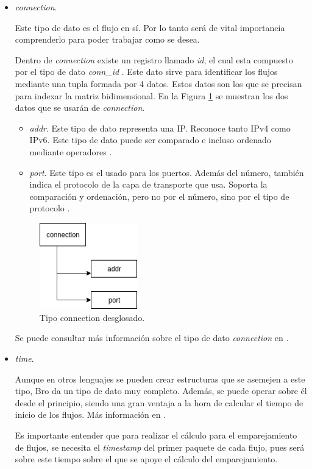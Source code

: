 \begin{itemize}

\item \textit{connection}. 

\intro Este tipo de dato es el flujo en sí. Por lo tanto será de vital importancia comprenderlo para poder trabajar como se desea.

\intro Dentro de \textit{connection} existe un registro llamado \textit{id}, el cual esta compuesto por el tipo de dato \textit{conn\_id} \cite{broconnid}. Este dato sirve para identificar los flujos mediante una tupla formada por 4 datos. Estos datos son los que se 
precisan para indexar la matriz bidimensional. En la Figura \ref{fig.connection} se muestran los dos datos que se usarán de \textit{connection}.

  \begin{itemize}

  \item \textit{addr}. Este tipo de dato representa una IP. Reconoce tanto IPv4 como IPv6. Este tipo de dato puede 
  ser comparado e incluso ordenado mediante operadores \cite{broaddr}.

  \item \textit{port}. Este tipo es el usado para los puertos. Además del número, también indica el 
  protocolo de la capa de transporte que usa. Soporta la comparación y ordenación, pero no por el número, sino por 
  el tipo de protocolo \cite{broport}.
  \end{itemize}

\begin{figure}[H]
  \includegraphics[width=0.4\textwidth]{imagenes/connection.png}
  \centering
  \caption{Tipo connection desglosado.}\label{fig.connection}
\end{figure}

  
\intro Se puede consultar más información sobre el tipo de dato \textit{connection} en \cite{connectiontype}.

\item \textit{time}. 

\intro Aunque en otros lenguajes se pueden crear estructuras que se asemejen a este tipo, Bro da un tipo de dato muy completo. Además, 
se puede operar sobre él desde el principio, siendo una gran ventaja a la hora de calcular el tiempo de inicio de los flujos. Más 
información en \cite{timetype}.

\intro Es importante entender que para realizar el cálculo para el emparejamiento de flujos, se necesita el 
\textit{timestamp} del primer paquete de cada flujo, pues será sobre este tiempo sobre el que se apoye el 
cálculo del emparejamiento.

\end{itemize}

